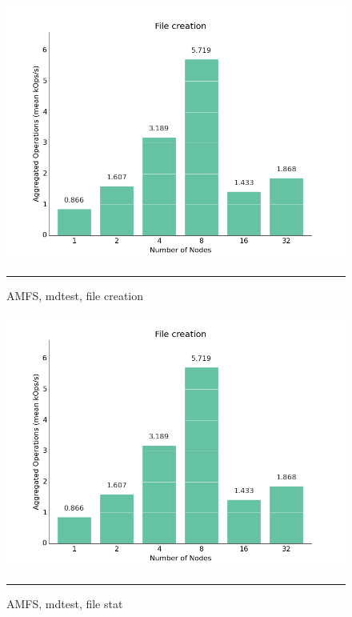 \begin{figure}[H]
  \centering
    \includegraphics[scale=0.6]{Figures/amfs_mdtest_create.png}
    \rule{25em}{0.5pt}
  \caption[AMFS, mdtest, file creation]{AMFS, mdtest, file creation}
  \label{fig:plot7}
\end{figure}

\begin{figure}[H]
  \centering
    \includegraphics[scale=0.6]{Figures/amfs_mdtest_create.png}
    \rule{25em}{0.5pt}
  \caption[AMFS, mdtest, file stat]{AMFS, mdtest, file stat}
  \label{fig:plot8}
\end{figure}